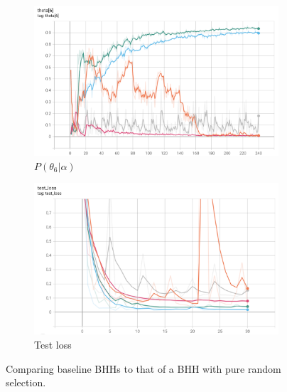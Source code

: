 \begin{figure}[htbp]
    \begin{subfigure}{0.5\textwidth}
    	\centering
        \includegraphics[width=\textwidth]{analysis/bhh_case_study/iris/no_learning_theta.png}
        \caption{$P(\theta_{6} | \alpha)$}
        \label{fig:results:case_study:iris:no_learn:p_theta}
    \end{subfigure}
    \begin{subfigure}{0.5\textwidth}
    	\centering
        \includegraphics[width=\textwidth]{analysis/bhh_case_study/iris/no_learning_test_loss.png}
        \caption{Test loss}
        \label{fig:results:case_study:iris:no_learn:test:loss}
    \end{subfigure}
    \par\bigskip
    \caption{Comparing baseline \Acp{BHH} to that of a \Ac{BHH} with pure random selection.}
    \label{fig:results:case_study:iris:no_learn:metrics}
\end{figure}

